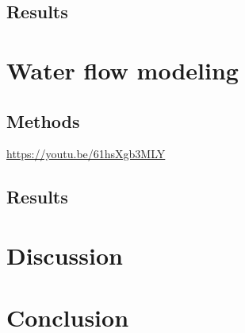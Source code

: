 \documentclass[Afour,sageh,times]{sagej}
\begin{document}
\subsection{Results}

%

\section{Water flow modeling}
\subsection{Methods}

\url{https://youtu.be/61hsXgb3MLY}

\subsection{Results}

%

\section{Discussion}









\section{Conclusion}
\end{document}
